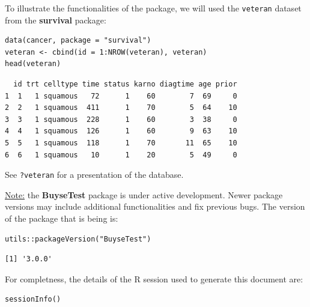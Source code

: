 \documentclass[12pt]{article}
\begin{document}
To illustrate the functionalities of the package, we will used the
\texttt{veteran} dataset from the \textbf{survival} package:
\lstset{language=r,label= ,caption= ,captionpos=b,numbers=none}
\begin{lstlisting}
data(cancer, package = "survival")
veteran <- cbind(id = 1:NROW(veteran), veteran)
head(veteran)
\end{lstlisting}

\begin{verbatim}
  id trt celltype time status karno diagtime age prior
1  1   1 squamous   72      1    60        7  69     0
2  2   1 squamous  411      1    70        5  64    10
3  3   1 squamous  228      1    60        3  38     0
4  4   1 squamous  126      1    60        9  63    10
5  5   1 squamous  118      1    70       11  65    10
6  6   1 squamous   10      1    20        5  49     0
\end{verbatim}


See \texttt{?veteran} for a presentation of the database.

\bigskip

\uline{Note:} the \textbf{BuyseTest} package is under active development. Newer
package versions may include additional functionalities and fix
previous bugs. The version of the package that is being is:
\lstset{language=r,label= ,caption= ,captionpos=b,numbers=none}
\begin{lstlisting}
utils::packageVersion("BuyseTest")
\end{lstlisting}

\begin{verbatim}
[1] '3.0.0'
\end{verbatim}


For completness, the details of the R session used to generate this
document are:
\lstset{language=r,label= ,caption= ,captionpos=b,numbers=none}
\begin{lstlisting}
sessionInfo()
\end{lstlisting}
\end{document}
